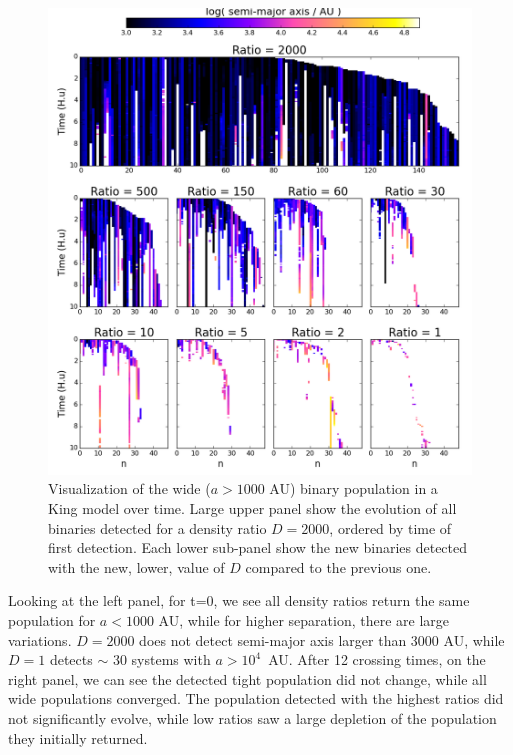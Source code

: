 \begin{figure}
\begin{center}
\includegraphics[width=\textwidth]{Figures/5_flickering}
\caption[Visualization of the wide binary population in a King model over time]{Visualization of the wide ($a>1000$ AU) binary population in a King model over time. Large upper panel show the evolution of all binaries detected for a density ratio $D=2000$, ordered by time of first detection. Each lower sub-panel show the new binaries detected with the new, lower, value of $D$ compared to the previous one.}
\label{Fig:5_flickering}
\end{center}
\end{figure}

Looking at the left panel, for t=0, we see all density ratios return the same population for $a < 1000$ AU, while for higher separation, there are large variations. $D = 2000$ does not detect semi-major axis larger than 3000 AU, while $D = 1$ detects $\sim$ 30 systems with $a > 10^4$~AU. After 12 crossing times, on the right panel, we can see the detected tight population did not change, while all wide populations converged. The population detected with the highest ratios did not significantly evolve, while low ratios saw a large depletion of the population they initially returned. 


